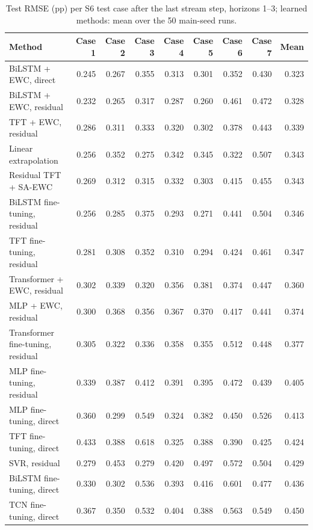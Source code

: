 \begin{table}[t]
  \centering
  \caption{Test RMSE (pp) per S6 test case after the last stream step, horizons 1--3; learned methods: mean over the 50 main-seed runs.}
  \label{tab:d24-per-group-e1}
  \setlength{\tabcolsep}{3pt}
  \scriptsize
  \begin{tabular}{lrrrrrrrr}
    \toprule
    Method & Case 1 & Case 2 & Case 3 & Case 4 & Case 5 & Case 6 & Case 7 & Mean \\
    \midrule
    BiLSTM + EWC, direct & 0.245 & 0.267 & 0.355 & 0.313 & 0.301 & 0.352 & 0.430 & 0.323 \\
    BiLSTM + EWC, residual & 0.232 & 0.265 & 0.317 & 0.287 & 0.260 & 0.461 & 0.472 & 0.328 \\
    TFT + EWC, residual & 0.286 & 0.311 & 0.333 & 0.320 & 0.302 & 0.378 & 0.443 & 0.339 \\
    Linear extrapolation & 0.256 & 0.352 & 0.275 & 0.342 & 0.345 & 0.322 & 0.507 & 0.343 \\
    Residual TFT + SA-EWC & 0.269 & 0.312 & 0.315 & 0.332 & 0.303 & 0.415 & 0.455 & 0.343 \\
    BiLSTM fine-tuning, residual & 0.256 & 0.285 & 0.375 & 0.293 & 0.271 & 0.441 & 0.504 & 0.346 \\
    TFT fine-tuning, residual & 0.281 & 0.308 & 0.352 & 0.310 & 0.294 & 0.424 & 0.461 & 0.347 \\
    Transformer + EWC, residual & 0.302 & 0.339 & 0.320 & 0.356 & 0.381 & 0.374 & 0.447 & 0.360 \\
    MLP + EWC, residual & 0.300 & 0.368 & 0.356 & 0.367 & 0.370 & 0.417 & 0.441 & 0.374 \\
    Transformer fine-tuning, residual & 0.305 & 0.322 & 0.336 & 0.358 & 0.355 & 0.512 & 0.448 & 0.377 \\
    MLP fine-tuning, residual & 0.339 & 0.387 & 0.412 & 0.391 & 0.395 & 0.472 & 0.439 & 0.405 \\
    MLP fine-tuning, direct & 0.360 & 0.299 & 0.549 & 0.324 & 0.382 & 0.450 & 0.526 & 0.413 \\
    TFT fine-tuning, direct & 0.433 & 0.388 & 0.618 & 0.325 & 0.388 & 0.390 & 0.425 & 0.424 \\
    SVR, residual & 0.279 & 0.453 & 0.279 & 0.420 & 0.497 & 0.572 & 0.504 & 0.429 \\
    BiLSTM fine-tuning, direct & 0.330 & 0.302 & 0.536 & 0.393 & 0.416 & 0.601 & 0.477 & 0.436 \\
    TCN fine-tuning, direct & 0.367 & 0.350 & 0.532 & 0.404 & 0.388 & 0.563 & 0.549 & 0.450 \\

\end{tabular}
\end{table}
